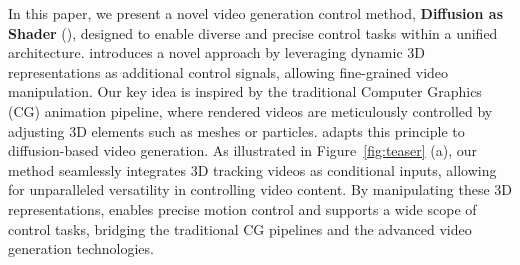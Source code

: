 

In this paper, we present a novel video generation control method, \textbf{Diffusion as Shader} (\methodname), designed to enable diverse and precise control tasks within a unified architecture. \methodname introduces a novel approach by leveraging dynamic 3D representations as additional control signals, allowing fine-grained video manipulation. Our key idea is inspired by the traditional Computer Graphics (CG) animation pipeline, where rendered videos are meticulously controlled by adjusting 3D elements such as meshes or particles. 
\methodname adapts this principle to diffusion-based video generation. As illustrated in Figure~\ref{fig:teaser} (a), our method seamlessly integrates 3D tracking videos as conditional inputs, allowing for unparalleled versatility in controlling video content. By manipulating these 3D representations, \methodname enables precise motion control and supports a wide scope of control tasks, bridging the traditional CG pipelines and the advanced video generation technologies.


